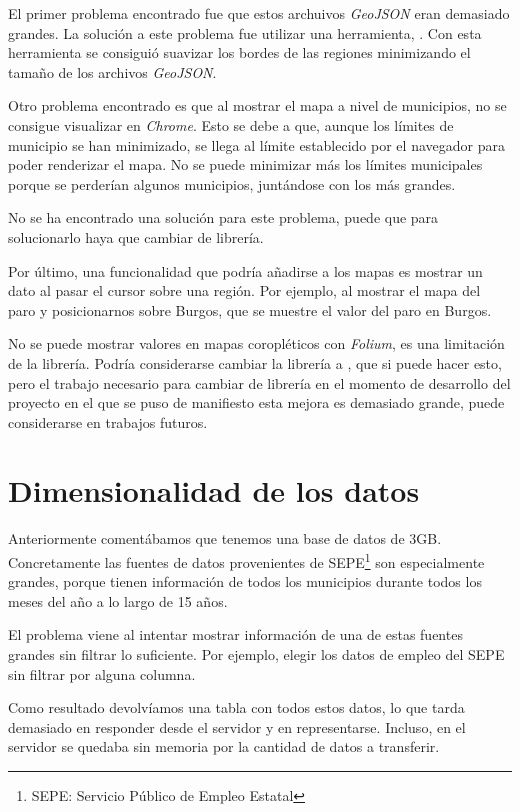 El primer problema encontrado fue que estos archuivos \textit{GeoJSON} eran demasiado grandes. La solución a este problema fue utilizar una herramienta, . Con esta herramienta se consiguió suavizar los bordes de las regiones minimizando el tamaño de los archivos \textit{GeoJSON}.

Otro problema encontrado es que al mostrar el mapa a nivel de municipios, no se consigue visualizar en \textit{Chrome}. Esto se debe a que, aunque los límites de municipio se han minimizado, se llega al límite establecido por el navegador para poder renderizar el mapa. No se puede minimizar más los límites municipales porque se perderían algunos municipios, juntándose con los más grandes.

No se ha encontrado una solución para este problema, puede que para solucionarlo haya que cambiar de librería.

Por último, una funcionalidad que podría añadirse a los mapas es mostrar un dato al pasar el cursor sobre una región. Por ejemplo, al mostrar el mapa del paro y posicionarnos sobre Burgos, que se muestre el valor del paro en Burgos.

No se puede mostrar valores en mapas coropléticos con \textit{Folium}, es una limitación de la librería. Podría considerarse cambiar la librería a , que si puede hacer esto, pero el trabajo necesario para cambiar de librería en el momento de desarrollo del proyecto en el que se puso de manifiesto esta mejora es demasiado grande, puede considerarse en trabajos futuros.

\section{Dimensionalidad de los datos}

Anteriormente comentábamos que tenemos una base de datos de 3GB. Concretamente las fuentes de datos provenientes de SEPE\footnote{SEPE: Servicio Público de Empleo Estatal} son especialmente grandes, porque tienen información de todos los municipios durante todos los meses del año a lo largo de 15 años.

El problema viene al intentar mostrar información de una de estas fuentes grandes sin filtrar lo suficiente. Por ejemplo, elegir los datos de empleo del SEPE sin filtrar por alguna columna.

Como resultado devolvíamos una tabla con todos estos datos, lo que tarda demasiado en responder desde el servidor y en representarse. Incluso, en el servidor se quedaba sin memoria por la cantidad de datos a transferir.

